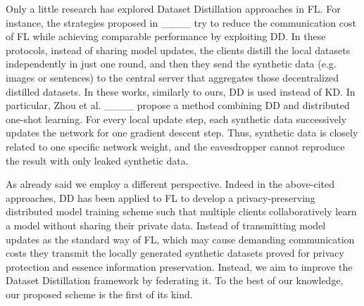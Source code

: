 Only a little research has explored Dataset Distillation approaches in FL. For instance, the strategies proposed in ____ try to reduce the communication cost of FL while achieving comparable performance by exploiting DD. In these protocols, instead of sharing model updates, the clients distill
the local datasets independently in just one round, and then they send the synthetic data (e.g. images or sentences) to the central server that aggregates those decentralized distilled datasets. In these works, similarly to ours, DD is used instead of KD. In particular, Zhou et al. ____ propose a method combining DD and distributed one-shot learning. For every local update step, each synthetic data successively updates the network for one gradient descent step. Thus, synthetic data is closely related to one specific network weight, and the eavesdropper cannot reproduce the result with only leaked synthetic data.

As already said we employ a different perspective. Indeed in the above-cited approaches, DD has been applied to FL to develop a
privacy-preserving distributed model training scheme such that
multiple clients collaboratively learn a model without sharing
their private data. Instead of transmitting model updates as the standard way of FL, which may cause demanding communication costs they transmit the locally generated synthetic datasets proved for
privacy protection and essence information preservation. Instead, we aim to improve the Dataset Distillation framework by federating it.
To the best of our knowledge, our proposed scheme is the first of its kind.